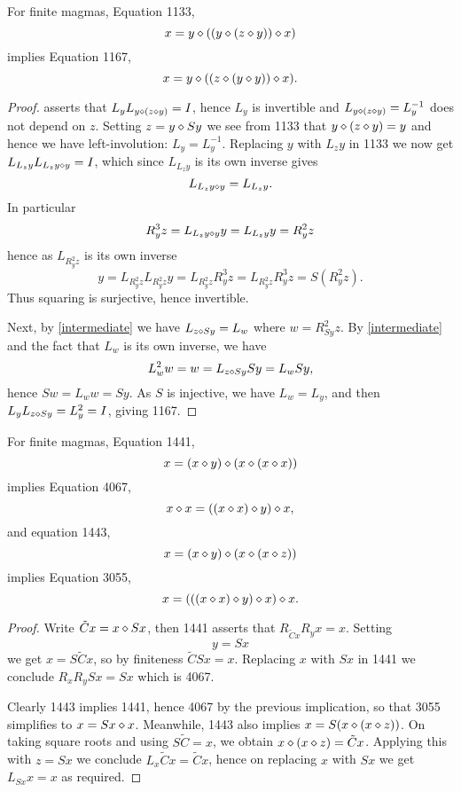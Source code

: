 \begin{proposition}[1133 implies 1167]\label{1133-1167}\leanok{}
  For finite magmas, Equation 1133,
$$ x = y \diamond ((y \diamond (z \diamond y)) \diamond x)$$
implies Equation 1167,
  $$ x = y \diamond ((z \diamond (y \diamond y)) \diamond x).$$
\end{proposition}

\begin{proof} asserts that $L_y L_{y \diamond (z \diamond y)} = I$, hence $L_y$ is invertible and $L_{y \diamond (z \diamond y)} = L_y^{-1}$ does not depend on $z$.  Setting $z = y \diamond Sy$ we see from 1133 that $y \diamond (z \diamond y) = y$ and hence we have left-involution: $L_y = L_y^{-1}$. Replacing $y$ with $L_z y$ in 1133 we now get $L_{L_z y} L_{L_z y \diamond y} = I$, which since $L_{L_z y}$ is its own inverse gives
\begin{equation}\label{intermediate}
  L_{L_z y \diamond y} = L_{L_z y}.
\end{equation}
In particular
$$ R_y^3 z = L_{L_z y \diamond y} y = L_{L_z y} y = R_y^2 z$$
hence as $L_{R_y^2 z}$ is its own inverse
$$ y =L_{R_y^2 z} L_{R_y^2 z} y = L_{R_y^2 z} R_y^3 z =
L_{R_y^2 z} R_y^3 z = S( R_y^2 z).$$
Thus squaring is surjective, hence invertible.

Next, by \eqref{intermediate} we have $L_{z \diamond Sy} = L_w$ where $w = R_{Sy}^2 z$.  By \eqref{intermediate} and the fact that $L_w$ is its own inverse, we have
$$ L_w^2 w = w = L_{z \diamond Sy} Sy =L_w Sy,$$
hence $Sw = L_w w = Sy$.  As $S$ is injective, we have $L_w = L_y$, and then $L_y L_{z \diamond Sy} = L_y^2 = I$, giving 1167.
\end{proof}

\begin{proposition}\label{1441-4067-1443-3055}\leanok{}
  For finite magmas, Equation 1441,
$$ x = (x \diamond y) \diamond (x \diamond (x \diamond x))$$
implies Equation 4067,
$$ x \diamond x = ((x \diamond x) \diamond y) \diamond x,$$
and equation 1443,
$$ x = (x \diamond y) \diamond (x \diamond (x \diamond z))$$
implies Equation 3055,
$$ x = (((x \diamond x) \diamond y) \diamond x) \diamond x.$$
\end{proposition}

\begin{proof}\leanok
  Write $\tilde C x = x \diamond Sx$, then 1441 asserts that $R_{\tilde Cx} R_y x = x$.  Setting $$y=Sx$$ we get $x = S\tilde Cx$, so by finiteness $\tilde C Sx = x$.  Replacing $x$ with $Sx$ in 1441 we conclude $R_x R_y Sx = Sx$ which is 4067.

  Clearly 1443 implies 1441, hence 4067 by the previous implication, so that 3055 simplifies to $x = Sx \diamond x$.  Meanwhile, 1443 also implies $x = S(x \diamond (x \diamond z))$.  On taking square roots and using $S \tilde C = x$, we obtain $x \diamond (x \diamond z) = \tilde Cx$.  Applying this with $z = Sx$ we conclude $L_x \tilde Cx = \tilde Cx$, hence on replacing $x$ with $Sx$ we get $L_{Sx} x = x$ as required.
\end{proof}

